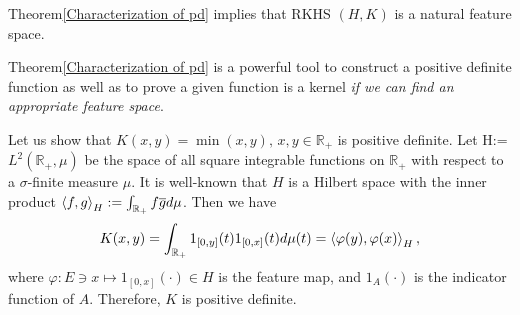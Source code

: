 \documentclass[a4paper,12pt]{article}
\begin{document}
\begin{rem}
	Theorem\ref{Characterization of pd} implies that RKHS \( (H,K) \) is a natural feature space.
	\fin\end{rem}

Theorem\ref{Characterization of pd} is a powerful tool to construct a positive definite function as well as to prove a given function is a kernel \textit{if we can find an appropriate feature space}.
\begin{ex}
	Let us show that \( K(x,y) = \min(x,y),\,x,y \in \mathbb{R}_{+} \) is positive definite.
	Let H:=\( L^2(\mathbb{R}_{+}, \mu) \) be the space of all square integrable functions on \( \mathbb{R}_{+} \) with respect to a \( \sigma \)-finite measure \( \mu \). It is well-known that \( H \) is a Hilbert space with the inner product \( \left<f, g \right>_H := \int_{\mathbb{R}_{+}} f \overline{g} d \mu\). Then we have
	\begin{equation*}
		K(x,y) = \int_{\mathbb{R}_{+}} 1_{[0,y]}(t) 1_{[0,x]}(t) d \mu(t) = \left<\varphi(y), \varphi(x) \right>_H,
	\end{equation*}
	where \( \varphi:E \ni x \mapsto 1_{[0,x]}(\cdot ) \in H \) is the feature map, and \( 1_A(\cdot ) \) is the indicator function of \( A \). Therefore, \( K \) is positive definite. \fin
\end{ex}
\end{document}

